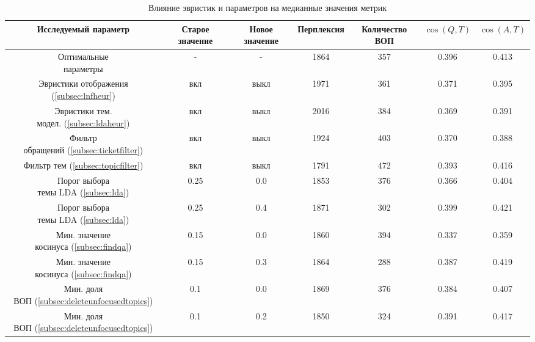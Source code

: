 \begin{landscape}
\begin{table}[t]
  \caption{Влияние эвристик и параметров на медианные значения метрик}
  \label{quality}
  \centering
  \begin{tabular}{|c|c|c||c|c|c|c|}
     \hline
      \parbox[t]{3cm}{\textbf{Исследуемый параметр}} &%
     \parbox[t]{2cm}{\textbf{Старое значение}} &%
     \parbox[t]{1.7cm}{\textbf{Новое значение}} &%
     \textbf{Перплексия} &%
     \parbox[t]{2cm}{\textbf{Количество ВОП}} &%
     \textbf{$\cos(Q,T)$} &%
     \textbf{$\cos(A,T)$} \\
	 \hline
     \parbox[t]{3cm}{Оптимальные\\параметры} &%
     - &%
     - &%
	 1864 &%
     357 &%
 	 0.396 &%
     0.413 \\
  	 \hline
     \parbox[t]{3cm}{Эвристики отображения (\ref{subsec:lnfheur})} &%
     вкл &%
     выкл &%
	 1971 &%
     361 &%
 	 0.371 &%
     0.395 \\
	 \hline
	 \parbox[t]{3cm}{Эвристики тем.\\модел. (\ref{subsec:ldaheur})} &%
     вкл &%
     выкл &%
	 2016 &%
     384 &%
 	 0.369 &%
     0.391 \\
	 \hline
\parbox[t]{3cm}{Фильтр\\обращений (\ref{subsec:ticketfilter})} &%
     вкл &%
     выкл &%
	 1924 &%
     403 &%
 	 0.370 &%
     0.388 \\
	 \hline
\parbox[t]{3cm}{Фильтр тем (\ref{subsec:topicfilter})} &%
     вкл &%
     выкл &%
	 1791 &%
     472 &%
 	 0.393 &%
     0.416 \\
     \hline
\parbox[t]{3cm}{Порог выбора\\темы LDA (\ref{subsec:lda})} &%
     0.25 &%
     0.0 &%
	 1853 &%
     376 &%
 	 0.366 &%
     0.404 \\
     \hline
\parbox[t]{3cm}{Порог выбора\\темы LDA (\ref{subsec:lda})} &%
     0.25 &%
     0.4 &%
	 1871 &%
     302 &%
 	 0.399 &%
     0.421 \\
     \hline
\parbox[t]{3cm}{Мин. значение\\косинуса (\ref{subsec:findqa})} &%
     0.15 &%
     0.0 &%
	 1860 &%
     394 &%
 	 0.337 &%
     0.359 \\
     \hline
\parbox[t]{3cm}{Мин. значение\\косинуса (\ref{subsec:findqa})} &%
     0.15 &%
     0.3 &%
	 1864 &%
     288 &%
 	 0.387 &%
     0.419 \\
     \hline         
\parbox[t]{3cm}{Мин. доля\\ВОП (\ref{subsec:deleteunfocusedtopics})} &%
     0.1 &%
     0.0 &%
	 1869 &%
     376 &%
 	 0.384 &%
     0.407 \\
     \hline
\parbox[t]{3cm}{Мин. доля\\ВОП (\ref{subsec:deleteunfocusedtopics})} &%
     0.1 &%
     0.2 &%
	 1850 &%
     324 &%
 	 0.391 &%
     0.417 \\
     \hline     
  \end{tabular}

\end{table}
\end{landscape}

